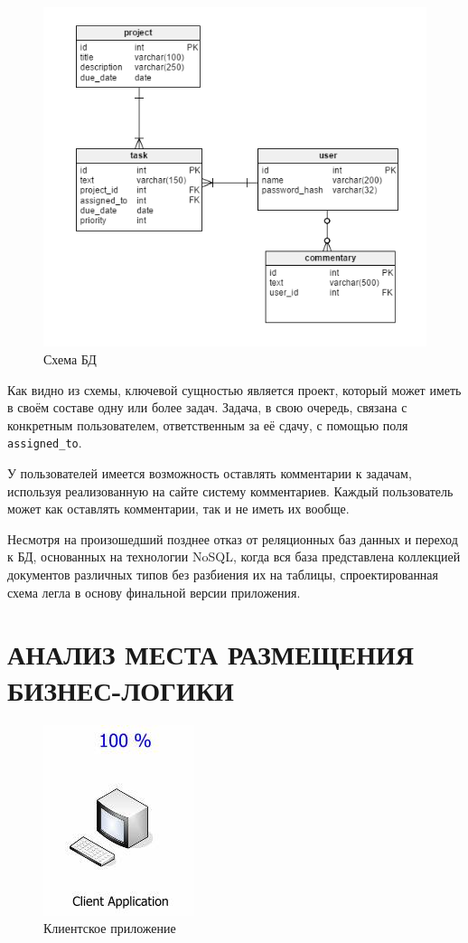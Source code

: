 \documentclass[14pt, a4paper]{extreport}
\begin{document}
\begin{figure}[!htb]
  \centering
    \includegraphics[scale=0.6]{../shared_images/schema.png}
   \caption{Схема БД}
    \label{fig:start}
\end{figure}

Как видно из схемы, ключевой сущностью является проект, который может иметь в своём составе одну или более задач. Задача, в свою очередь, связана с конкретным пользователем, ответственным за её сдачу, с помощью поля {\tt assigned\_to}.

У пользователей имеется возможность оставлять комментарии к задачам, используя реализованную на сайте систему комментариев. Каждый пользователь может как оставлять комментарии, так и не иметь их вообще.

Несмотря на произошедший позднее отказ от реляционных баз данных и переход к БД, основанных на технологии NoSQL, когда вся база представлена коллекцией документов различных типов без разбиения их на таблицы, спроектированная схема легла в основу финальной версии приложения.

\section{\MakeTextUppercase{Анализ места размещения бизнес-логики}}
\begin{figure}[!htb]
  \centering
    \includegraphics[scale=0.6]{../shared_images/business-logic/client.jpg}
   \caption{Клиентское приложение}
    \label{fig:start}
\end{figure}
\end{document}
